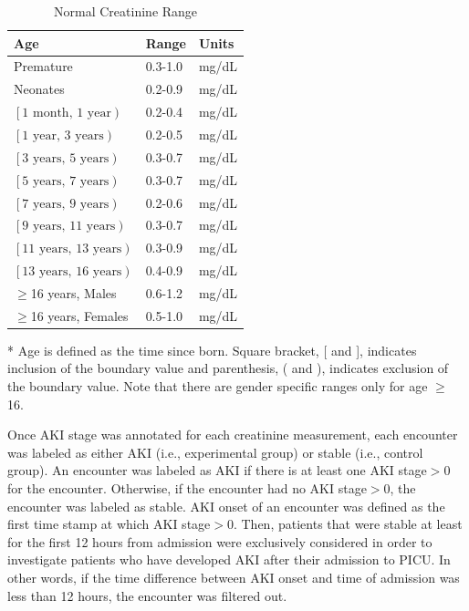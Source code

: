 \documentclass[
   technote
]{phildoc}
\newcommand{\ie}{i.e.,}
\begin{document}
\begin{table}[! htbp] \centering \caption{Normal Creatinine Range} \label{tab:bs_scr}
\begin{threeparttable}
\begin{tabular}{| l | l | l |}
\hline
Age & Range & Units \\ \hline \hline
Premature & 0.3-1.0 & mg/dL \\
Neonates & 0.2-0.9 & mg/dL \\
$\left[\right.\text{1 month, 1 year} \left. \right)$ & 0.2-0.4 & mg/dL \\
$\left[\right. \text{1 year, 3 years} \left. \right)$ & 0.2-0.5 & mg/dL \\
$\left[\right. \text{3 years, 5 years} \left. \right)$ & 0.3-0.7 & mg/dL \\
$\left[\right. \text{5 years, 7 years} \left. \right)$ & 0.3-0.7 & mg/dL \\
$\left[\right. \text{7 years, 9 years} \left. \right)$ & 0.2-0.6 & mg/dL \\
$\left[\right. \text{9 years, 11 years} \left. \right)$ & 0.3-0.7 & mg/dL \\
$\left[\right. \text{11 years, 13 years} \left. \right)$ & 0.3-0.9 & mg/dL \\
$\left[\right. \text{13 years, 16 years} \left. \right)$ & 0.4-0.9 & mg/dL \\
$\geq$16 years, Males & 0.6-1.2 & mg/dL \\
$\geq$16 years, Females & 0.5-1.0 & mg/dL \\ \hline
\end{tabular}
\begin{tablenotes}
\item[*] Age is defined as the time since born. Square bracket, [ and ],  indicates inclusion of the boundary value and parenthesis, ( and ), indicates exclusion of the boundary value. Note that there are gender specific ranges only for age $\geq$ 16.
\end{tablenotes}
\end{threeparttable}
\end{table}

Once AKI stage was annotated for each creatinine measurement, each encounter was labeled as either AKI (\ie{} experimental group) or stable (\ie{} control group). An encounter was labeled as AKI if there is at least one AKI stage$>0$ for the encounter. Otherwise, if the encounter had no AKI stage$>0$, the encounter was labeled as stable. AKI onset of an encounter was defined as the first time stamp at which AKI stage$>0$. Then, patients that were stable at least for the first 12 hours from admission were exclusively considered in order to investigate patients who have developed AKI after their admission to PICU. In other words, if the time difference between AKI onset and time of admission was less than 12 hours, the encounter was filtered out.
\end{document}

